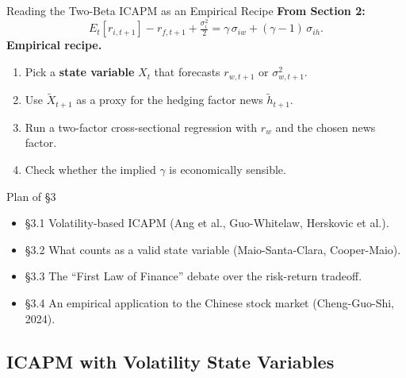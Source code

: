 \documentclass{beamer}
\begin{document}
\begin{frame}[shrink=8]{Reading the Two-Beta ICAPM as an Empirical Recipe}
	\textbf{From Section 2:}
	\begin{equation*}
		E_t[r_{i,t+1}] - r_{f,t+1} + \tfrac{\sigma_i^2}{2} = \gamma\,\sigma_{iw} + (\gamma-1)\,\sigma_{ih}.
	\end{equation*}
	\textbf{Empirical recipe.}
	\begin{enumerate}
		\item Pick a \textbf{state variable} $X_t$ that forecasts $r_{w,t+1}$ or $\sigma^2_{w,t+1}$.
		\item Use $\widetilde{X}_{t+1}$ as a proxy for the hedging factor news $\widetilde{h}_{t+1}$.
		\item Run a two-factor cross-sectional regression with $r_w$ and the chosen news factor.
		\item Check whether the implied $\gamma$ is economically sensible.
	\end{enumerate}
	\vspace{4pt}
	\begin{block}{Plan of \S 3}
		\begin{itemize}
			\item \S 3.1 Volatility-based ICAPM (Ang et al., Guo-Whitelaw, Herskovic et al.).
			\item \S 3.2 What counts as a valid state variable (Maio-Santa-Clara, Cooper-Maio).
			\item \S 3.3 The ``First Law of Finance'' debate over the risk-return tradeoff.
			\item \S 3.4 An empirical application to the Chinese stock market (Cheng-Guo-Shi, 2024).
		\end{itemize}
	\end{block}
\end{frame}

\subsection{ICAPM with Volatility State Variables}
\end{document}
